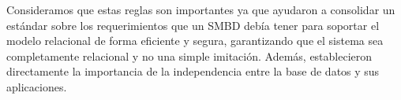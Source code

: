     Consideramos que estas reglas son importantes ya que ayudaron a consolidar un estándar sobre los requerimientos que un SMBD debía tener para soportar el modelo relacional de forma eficiente y segura, garantizando que el sistema sea completamente relacional y no una simple imitación. Además, establecieron directamente la importancia de la independencia entre la base de datos y sus aplicaciones.

